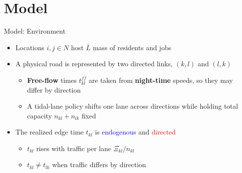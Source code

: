 \documentclass[11pt,aspectratio=169]{beamer}
\begin{document}
\section{Model}

\begin{frame}{Model: Environment}
\begin{itemize}
  \item Locations $i,j\in N$ host $\bar{L}$ mass of residents and jobs
  \vspace{0.5em}
  \item A physical road is represented by two directed links, $(k,l)$ and $(l,k)$
  \begin{itemize}
    \item \textbf{Free-flow} times $t_{kl}^{ff}$ are taken from \textbf{night-time} speeds, so they may differ by direction
    \item A tidal-lane policy shifts one lane across directions while holding total capacity $n_{kl}+n_{lk}$ fixed
  \end{itemize}
  \vspace{0.5em}
  \item The realized edge time $t_{kl}$ is \textcolor{blue}{endogenous} and \textcolor{red}{directed}
  \begin{itemize}
    \item $t_{kl}$ rises with traffic per lane $\Xi_{kl}/n_{kl}$
    \item $t_{kl} \neq t_{lk}$ when traffic differs by direction
  \end{itemize}
\end{itemize}
\end{frame}
\end{document}
